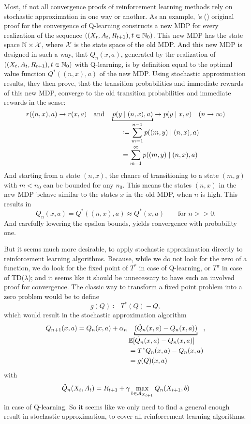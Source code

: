 Most, if not all convergence proofs of reinforcement learning methods rely on stochastic approximation in one way or another. As an example, \citeauthor{watkinsQlearning1992}'s (\citeyear{watkinsQlearning1992}) original proof for the convergence of Q-learning constructs a new MDP for every realization of the sequence \(((X_t, A_t,R_{t+1}), t\in\mathbb{N}_0)\). This new MDP has the state space \(\mathbb{N}\times\mathcal{X}\), where \(\mathcal{X}\) is the state space of the old MDP. And this new MDP is designed in such a way, that \(Q_n(x,a)\), generated by the realization of \(((X_t, A_t,R_{t+1}), t\in\mathbb{N}_0)\) with Q-learning, is by definition equal to the optimal value function \(Q^*((n,x),a)\) of the new MDP. Using stochastic approximation results, they then prove, that the transition probabilities and immediate rewards of this new MDP, converge to the old transition probabilities and immediate rewards in the sense:
\[
    r((n,x),a) \to r(x,a) \quad \text{and}\quad \underbracket[1pt]{p(y\mid (n,x), a)}_{
        \begin{aligned}
            &\coloneqq\sum_{m=1}^{n-1}\mathrlap{p((m,y)\mid (n,x),a)}\\
            &=\sum_{m=1}^{\infty}\mathrlap{p((m,y)\mid (n,x),a)}
        \end{aligned}
    }\to p(y\mid x,a) \quad (n\to \infty)
\]
And starting from a state \((n,x)\), the chance of transitioning to a state \((m,y)\) with \(m<n_0\) can be bounded for any \(n_0\). This means the states \((n,x)\) in the new MDP behave similar to the states \(x\) in the old MDP, when \(n\) is high. This results in 
\[
    Q_n(x,a)= Q^*((n,x),a)\approx Q^*(x,a) \qquad \text{for } n>>0.
\]
And carefully lowering the epsilon bounds, yields convergence with probability one.

But it seems much more desirable, to apply stochastic approximation directly to reinforcement learning algorithms. Because, while we do not look for the zero of a function, we do look for the fixed point of \(T^*\) in case of Q-learning, or \(T^\pi\) in case of TD(\(\lambda\)); and it seems like it should be unnecessary to have such an involved proof for convergence. The classic way to transform a fixed point problem into a zero problem would be to define
\[
    g(Q)\coloneqq T^*(Q)-Q,
\]
which would result in the stochastic approximation algorithm
\[
    Q_{n+1}(x,a) = Q_n(x,a) + \alpha_n \underbracket[1pt]{(\hat{Q}_n(x,a) -Q_n(x,a))}_{\begin{aligned}
        &\E[\hat{Q}_n(x,a) -Q_n(x,a)]\\
        &=T^*Q_n(x,a)-Q_n(x,a)\\
        &=g(Q)(x,a)  
    \end{aligned}},
\]
with 
\[
    \hat{Q}_n(X_t,A_t)=R_{t+1} + \gamma \max_{b\in\mathcal{A}_{X_{t+1}}} Q_n(X_{t+1}, b)
\] in case of Q-learning. So it seems like we only need to find a general enough result in stochastic approximation, to cover all reinforcement learning algorithms. 

